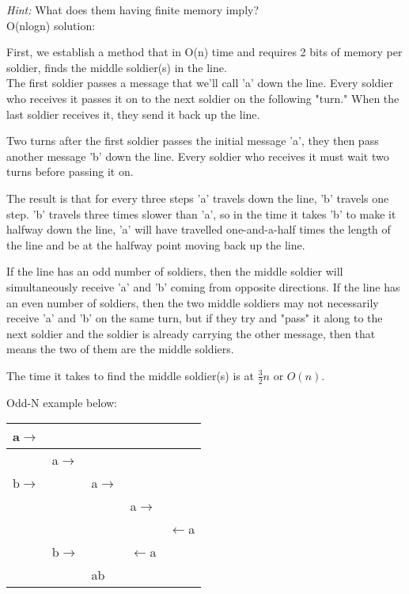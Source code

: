 \documentclass[11pt]{article}
\begin{document}
\emph{Hint:} What does them having finite memory imply?\\

O(nlogn) solution:

First, we establish a method that in O(n) time and requires 2 bits of memory per soldier, finds the middle soldier(s) in the line.\\

The first soldier passes a message that we'll call 'a' down the line. Every soldier who receives it passes it on to the next soldier on the following "turn." When the last soldier receives it, they send it back up the line.

Two turns after the first soldier passes the initial message 'a', they then pass another message 'b' down the line. Every soldier who receives it must wait two turns before passing it on.

The result is that for every three steps 'a' travels down the line, 'b' travels one step. 'b' travels three times slower than 'a', so in the time it takes 'b' to make it halfway down the line, 'a' will have travelled one-and-a-half times the length of the line and be at the halfway point moving back up the line.

If the line has an odd number of soldiers, then the middle soldier will simultaneously receive 'a' and 'b' coming from opposite directions. If the line has an even number of soldiers, then the two middle soldiers may not necessarily receive 'a' and 'b' on the same turn, but if they try and "pass" it along to the next soldier and the soldier is already carrying the other message, then that means the two of them are the middle soldiers.

The time it takes to find the middle soldier(s) is at $\frac{3}{2}n$ or $O(n)$.

Odd-N example below:\\

\begin{tabular}{|l|l|l|l|l|}
    \hline
        a$\rightarrow$&&&&\\
    \hline
        &a$\rightarrow$&&&\\
    \hline
        b$\rightarrow$&&a$\rightarrow$&&\\
    \hline
        &&&a$\rightarrow$&\\
    \hline
        &&&&$\leftarrow$a\\
    \hline
        &b$\rightarrow$&&$\leftarrow$a&\\
    \hline
        &&ab&&\\
    \hline
\end{tabular}
\end{document}
